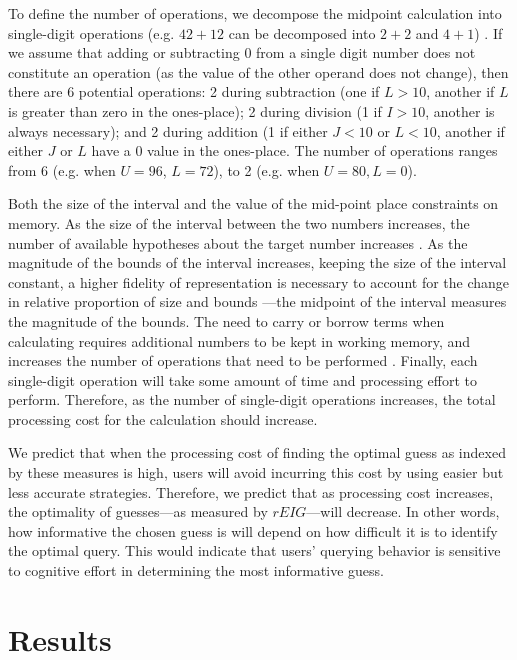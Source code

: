 \documentclass[10pt,letterpaper]{article}
\begin{document}
To define the number of operations, we decompose the midpoint calculation into single-digit operations (e.g. $42 + 12$ can be decomposed into $2 + 2$ and $4 + 1$) \cite{hitch1978role}. If we assume that adding or subtracting $0$ from a single digit number does not constitute an operation (as the value of the other operand does not change), then there are 6 potential operations: 2 during subtraction (one if $L > 10$, another if $L$ is greater than zero in the ones-place); 2 during division (1 if $I > 10$, another is always necessary); and 2 during addition (1 if either $J < 10$ or $L < 10$, another if either $J$ or $L$ have a 0 value in the ones-place. The number of operations ranges from 6 (e.g. when $U = 96$, $L = 72$), to 2 (e.g. when $U = 80, L = 0$).

Both the size of the interval and the value of the mid-point place constraints on memory. As the size of the interval between the two numbers increases, the number of available hypotheses about the target number increases \cite{zbrodoff19959+}. As the magnitude of the bounds of the interval increases, keeping the size of the interval constant, a higher fidelity of representation is necessary to account for the change in relative proportion of size and bounds \cite{DEHAENE2003145}---the midpoint of the interval measures the magnitude of the bounds.  
The need to carry or borrow terms when calculating requires additional numbers to be kept in working memory, and increases the number of operations that need to be performed \cite{imbo2007role2}.
Finally, each single-digit operation will take some amount of time and processing effort to perform. Therefore, as the number of single-digit operations increases, the total processing cost for the calculation should increase. 

We predict that when the processing cost of finding the optimal guess as indexed by these measures is high, users will avoid incurring this cost by using easier but less accurate strategies. Therefore, we predict that as processing cost increases, the optimality of guesses---as measured by $rEIG$---will decrease. In other words, how informative the chosen guess is will depend on how difficult it is to identify the optimal query. This would indicate that users' querying behavior is sensitive to cognitive effort in determining the most informative guess.

\section{Results}
\end{document}
